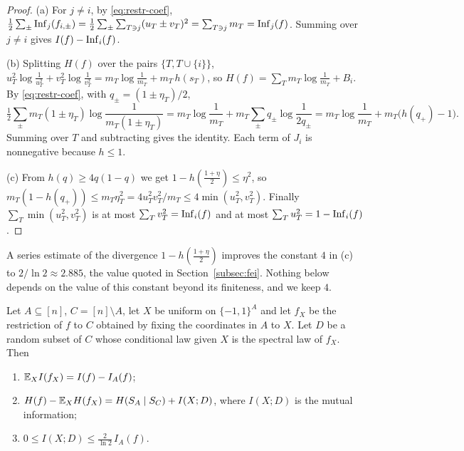 \begin{proof}
(a) For $j\ne i$, by \eqref{eq:restr-coef}, $\frac12\sum_\pm\operatorname{Inf}_j(f_{i,\pm})=\frac12\sum_\pm\sum_{T\ni j}(u_T\pm v_T)^2=\sum_{T\ni j}m_T=\operatorname{Inf}_j(f)$. Summing over $j\ne i$ gives $I(f)-\operatorname{Inf}_i(f)$.

(b) Splitting $H(f)$ over the pairs $\{T,T\cup\{i\}\}$, $u_T^2\log\frac1{u_T^2}+v_T^2\log\frac1{v_T^2}=m_T\log\frac1{m_T}+m_T\,h(s_T)$, so $H(f)=\sum_Tm_T\log\frac1{m_T}+B_i$. By \eqref{eq:restr-coef}, with $q_\pm=(1\pm\eta_T)/2$,
\[
\tfrac12\sum_\pm m_T(1\pm\eta_T)\log\frac1{m_T(1\pm\eta_T)}=m_T\log\frac1{m_T}+m_T\sum_\pm q_\pm\log\frac1{2q_\pm}=m_T\log\frac1{m_T}+m_T\bigl(h(q_+)-1\bigr).
\]
Summing over $T$ and subtracting gives the identity. Each term of $J_i$ is nonnegative because $h\le1$.

(c) From $h(q)\ge4q(1-q)$ we get $1-h(\frac{1+\eta}2)\le\eta^2$, so $m_T(1-h(q_+))\le m_T\eta_T^2=4u_T^2v_T^2/m_T\le4\min(u_T^2,v_T^2)$. Finally $\sum_T\min(u_T^2,v_T^2)$ is at most $\sum_Tv_T^2=\operatorname{Inf}_i(f)$ and at most $\sum_Tu_T^2=1-\operatorname{Inf}_i(f)$.
\end{proof}

\begin{remark}
A series estimate of the divergence $1-h(\frac{1+\eta}2)$ improves the constant $4$ in (c) to $2/\ln2\approx2.885$, the value quoted in Section~\ref{subsec:fei}. Nothing below depends on the value of this constant beyond its finiteness, and we keep $4$.
\end{remark}

\begin{lemma}\label{lem:block}
Let $A\subseteq[n]$, $C=[n]\setminus A$, let $X$ be uniform on $\{-1,1\}^A$ and let $f_X$ be the restriction of $f$ to $C$ obtained by fixing the coordinates in $A$ to $X$. Let $D$ be a random subset of $C$ whose conditional law given $X$ is the spectral law of $f_X$. Then
\begin{enumerate}[label=(\alph*)]
\item $\mathbb{E}_X I(f_X)=I(f)-I_A(f)$;
\item $H(f)-\mathbb{E}_XH(f_X)=H(S_A\mid S_C)+I(X;D)$, where $I(X;D)$ is the mutual information;
\item $0\le I(X;D)\le\frac{2}{\ln2}\,I_A(f)$.
\end{enumerate}
\end{lemma}

